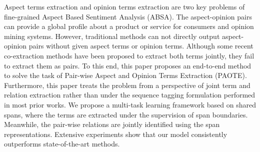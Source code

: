 Aspect terms extraction and opinion terms extraction are two key problems of fine-grained Aspect Based Sentiment Analysis (ABSA). The aspect-opinion pairs can provide a global profile about a product or service for consumers and opinion mining systems. However, traditional methods can not directly output aspect-opinion pairs without given aspect terms or opinion terms. Although some recent co-extraction methods have been proposed to extract both terms jointly, they fail to extract them as pairs. To this end, this paper proposes an end-to-end method to solve the task of Pair-wise Aspect and Opinion Terms Extraction (PAOTE). Furthermore, this paper treats the problem from a perspective of joint term and relation extraction rather than under the sequence tagging formulation performed in most prior works. We propose a multi-task learning framework based on shared spans, where the terms are extracted under the supervision of span boundaries. Meanwhile, the pair-wise relations are jointly identified using the span representations. Extensive experiments show that our model consistently outperforms state-of-the-art methods.
